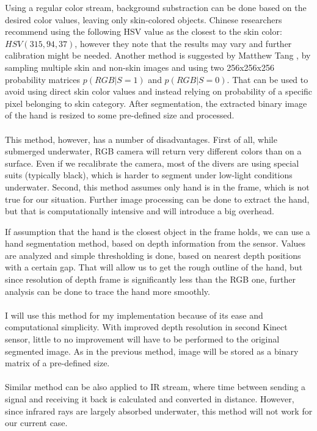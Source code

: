 \documentclass[a4paper,11pt,oneside]{article}
\begin{document}
  Using a regular color stream, background substraction can be done based on the desired color values, leaving only skin-colored objects. Chinese researchers \cite{HI01} recommend using the following HSV value as the closest to the skin color: $HSV(315, 94, 37)$, however they note that the results may vary and further calibration might be needed. Another method is suggested by Matthew Tang \cite{MT01}, by sampling multiple skin and non-skin images and using two 256x256x256 probability matrices $p(RGB|S = 1)$ and $p(RGB|S = 0)$. That can be used to avoid using direct skin color values and instead relying on probability of a specific pixel belonging to skin category. After segmentation, the extracted binary image of the hand is resized to some pre-defined size and processed.\\
  \\
  This method, however, has a number of disadvantages. First of all, while submerged underwater, RGB camera will return very different colors than on a surface. Even if we recalibrate the camera, most of the divers are using special suits (typically black), which is harder to segment under low-light conditions underwater. Second, this method assumes only hand is in the frame, which is not true for our situation. Further image processing can be done to extract the hand, but that is computationally intensive and will introduce a big overhead. 

  If assumption that the hand is the closest object in the frame holds, we can use a hand segmentation method, based on depth information from the sensor. Values are analyzed and simple thresholding is done, based on nearest depth positions with a certain gap. That will allow us to get the rough outline of the hand, but since resolution of depth frame is significantly less than the RGB one, further analysis \cite{ZH01} can be done to trace the hand more smoothly.\\
  \\
  I will use this method for my implementation because of its ease and computational simplicity. With improved depth resolution in second Kinect sensor, little to no improvement will have to be performed to the original segmented image. As in the previous method, image will be stored as a binary matrix of a pre-defined size.\\
  \\
  Similar method can be also applied to IR stream, where time between sending a signal and receiving it back is calculated and converted in distance. However, since infrared rays are largely absorbed underwater, this method will not work for our current case.
  
\end{document}
